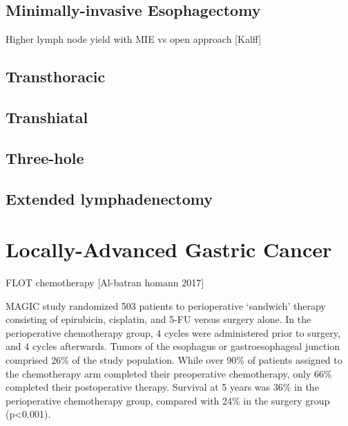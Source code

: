 \documentclass[
]{book}
\begin{document}
\hypertarget{minimally-invasive-esophagectomy-4}{%
\section{Minimally-invasive Esophagectomy}\label{minimally-invasive-esophagectomy-4}}

Higher lymph node yield with MIE vs open approach {[}Kalff{]}

\hypertarget{transthoracic-3}{%
\section{Transthoracic}\label{transthoracic-3}}

\hypertarget{transhiatal-3}{%
\section{Transhiatal}\label{transhiatal-3}}

\hypertarget{three-hole-3}{%
\section{Three-hole}\label{three-hole-3}}

\hypertarget{extended-lymphadenectomy-3}{%
\section{Extended lymphadenectomy}\label{extended-lymphadenectomy-3}}

\hypertarget{locally-advanced-gastric-cancer}{%
\chapter{Locally-Advanced Gastric Cancer}\label{locally-advanced-gastric-cancer}}

FLOT chemotherapy {[}Al-batran homann 2017{]}

MAGIC study randomized 503 patients to perioperative `sandwich' therapy consisting of epirubicin, cisplatin, and 5-FU versus surgery alone. In the perioperative chemotherapy group, 4 cycles were administered prior to surgery, and 4 cycles afterwards. Tumors of the esophagus or gastroesophageal junction comprised 26\% of the study population. While over 90\% of patients assigned to the chemotherapy arm completed their preoperative chemotherapy, only 66\% completed their postoperative therapy. Survival at 5 years was 36\% in the perioperative chemotherapy group, compared with 24\% in the surgery group (p\textless0.001).\citep{cunningham11}
\end{document}
